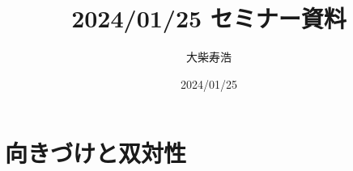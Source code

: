 \def\inner<#1>{\langle #1 \rangle}








\title{2024/01/25 セミナー資料}
\author{大柴寿浩}
\date{2024/01/25}

\maketitle

\section{向きづけと双対性{\cite[3.3]{KS90}}}

